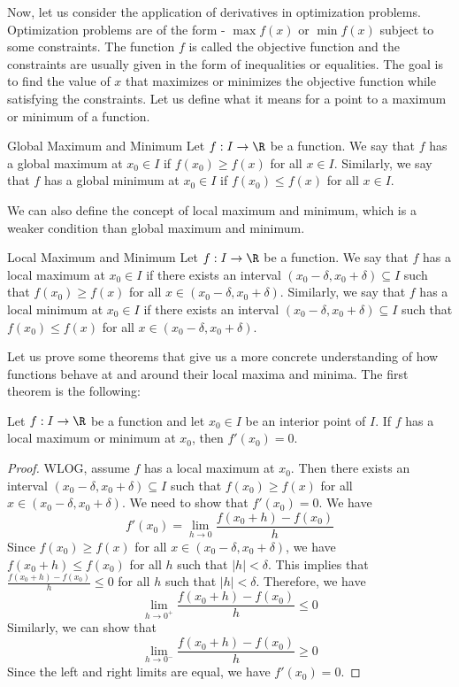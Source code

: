 \documentclass[openany]{book}
\begin{document}
Now, let us consider the application of derivatives in optimization problems. Optimization problems are of the form - 
$\max f(x)$ or $\min f(x)$ subject to some constraints. The function $f$ is called the objective function and the constraints are usually given in the form of inequalities or equalities. The goal is to find the value of $x$ that maximizes or minimizes the objective function while satisfying the constraints. Let us define what it means for a point to a maximum or minimum of a function.
\begin{mydefinition}{Global Maximum and Minimum}
    Let $f: I \to \R$ be a function. We say that $f$ has a global maximum at $x_0 \in I$ if $f(x_0) \geq f(x)$ for all $x \in I$. Similarly, we say that $f$ has a global minimum at $x_0 \in I$ if $f(x_0) \leq f(x)$ for all $x \in I$.
\end{mydefinition}
We can also define the concept of local maximum and minimum, which is a weaker condition than global maximum and minimum.
\begin{mydefinition}{Local Maximum and Minimum}
    Let $f: I \to \R$ be a function. We say that $f$ has a local maximum at $x_0 \in I$ if there exists an interval $(x_0 - \delta, x_0 + \delta) \subseteq I$ such that $f(x_0) \geq f(x)$ for all $x \in (x_0 - \delta, x_0 + \delta)$. Similarly, we say that $f$ has a local minimum at $x_0 \in I$ if there exists an interval $(x_0 - \delta, x_0 + \delta) \subseteq I$ such that $f(x_0) \leq f(x)$ for all $x \in (x_0 - \delta, x_0 + \delta)$.
\end{mydefinition}
Let us prove some theorems that give us a more concrete understanding of how functions behave at and around their local maxima and minima. The first theorem is the following:
\begin{mytheorem}
    Let $f: I \to \R$ be a function and let $x_0 \in I$ be an interior point of $I$. If $f$ has a local maximum or minimum at $x_0$, then $f'(x_0) = 0$.
\end{mytheorem}
\begin{proof}
    WLOG, assume $f$ has a local maximum at $x_0$. Then there exists an interval $(x_0 - \delta, x_0 + \delta) \subseteq I$ such that $f(x_0) \geq f(x)$ for all $x \in (x_0 - \delta, x_0 + \delta)$. We need to show that $f'(x_0) = 0$. We have 
\[
    f'(x_0) = \lim_{h \to 0} \frac{f(x_0 + h) - f(x_0)}{h}
\]
Since $f(x_0) \geq f(x)$ for all $x \in (x_0 - \delta, x_0 + \delta)$, we have $f(x_0 + h) \leq f(x_0)$ for all $h$ such that $|h| < \delta$. This implies that $\frac{f(x_0 + h) - f(x_0)}{h} \leq 0$ for all $h$ such that $|h| < \delta$. Therefore, we have
\[
    \lim_{h \to 0^+} \frac{f(x_0 + h) - f(x_0)}{h} \leq 0
\]
Similarly, we can show that
\[
    \lim_{h \to 0^-} \frac{f(x_0 + h) - f(x_0)}{h} \geq 0
\]
Since the left and right limits are equal, we have $f'(x_0) = 0$.
\end{proof}
\end{document}
